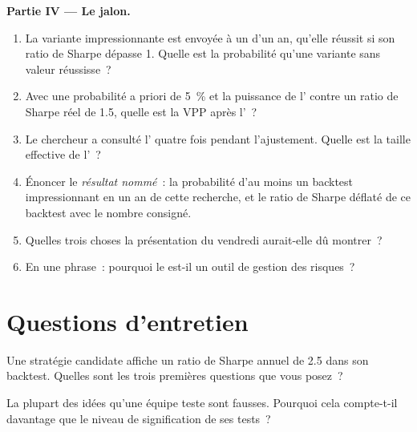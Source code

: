 \begin{problem}
\medskip\noindent\textbf{Partie IV --- Le jalon.}
\begin{enumerate}[resume]
\item La variante impressionnante est envoyée à un  d'un an, qu'elle réussit si son ratio de Sharpe dépasse 1. Quelle est la
probabilité qu'une variante sans valeur réussisse~?
\item Avec une probabilité a priori de 5~\% et la puissance de l' contre un ratio de Sharpe réel de 1.5, quelle est la VPP après l'~?
\item Le chercheur a consulté l' quatre fois pendant l'ajustement. Quelle est la taille effective de l'~?
\item Énoncer le \emph{résultat nommé}~: la probabilité d'au moins un backtest impressionnant en un an de cette recherche, et le
ratio de Sharpe déflaté de ce backtest avec le nombre consigné.
\item Quelles trois choses la présentation du vendredi aurait-elle dû montrer~?
\item En une phrase~: pourquoi le  est-il un outil de gestion des risques~?
\end{enumerate}
\end{problem}

\section{Questions d'entretien}

\begin{interviewq}\label{iq:rs:the-research-process:1}
Une stratégie candidate affiche un ratio de Sharpe annuel de 2.5 dans son backtest. Quelles sont les trois premières questions que vous posez~?
\end{interviewq}

\begin{interviewq}\label{iq:rs:the-research-process:2}
La plupart des idées qu'une équipe teste sont fausses. Pourquoi cela compte-t-il davantage que le niveau de signification de ses tests~?
\end{interviewq}

